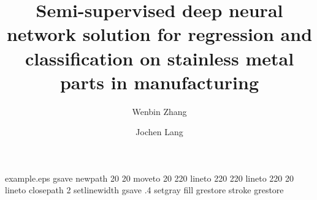 %
%
%
%
%
\begin{filecontents*}{example.eps}
gsave
newpath
  20 20 moveto
  20 220 lineto
  220 220 lineto
  220 20 lineto
closepath
2 setlinewidth
gsave
  .4 setgray fill
grestore
stroke
grestore
\end{filecontents*}
%
\RequirePackage{fix-cm}
%
\documentclass[smallextended]{svjour3}       %
%
\smartqed  %
%
\usepackage{graphicx}
%
%
%
%
%


\title{Semi-supervised deep neural network solution for regression and classification on stainless metal parts in manufacturing%
}


\author{Wenbin Zhang         \and
        Jochen Lang %
}



